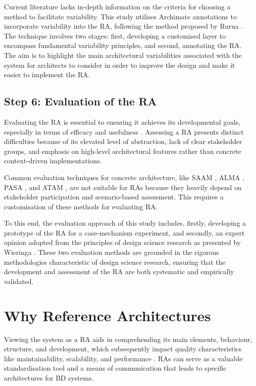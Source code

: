 \documentclass[review]{elsarticle}
\begin{document}
Current literature lacks in-depth information on the criteria for choosing a method to facilitate variability. This study utilises Archimate annotations to incorporate variability into the RA, following the method proposed by Rurua \cite{rurua2019representing}. The technique involves two stages: first, developing a customised layer to encompass fundamental variability principles, and second, annotating the RA. The aim is to highlight the main architectural variabilities associated with the system for architects to consider in order to improve the design and make it easier to implement the RA.

\subsection{Step 6: Evaluation of the RA}

Evaluating the RA is essential to ensuring it achieves its developmental goals, especially in terms of efficacy and usefulness \cite{Galster2011}. Assessing a RA presents distinct difficulties because of its elevated level of abstraction, lack of clear stakeholder groups, and emphasis on high-level architectural features rather than concrete context-driven implementations.

Common evaluation techniques for concrete architecture, like SAAM \cite{kazman1994saam}, ALMA \cite{Bengtsson2004}, PASA \cite{Williams2002}, and ATAM \cite{KazmanATAM}, are not suitable for RAs because they heavily depend on stakeholder participation and scenario-based assessment. This requires a customisation of these methods for evaluating RA.

To this end, the evaluation approach of this study includes, firstly, developing a prototype of the RA for a case-mechanism experiment, and secondly, an expert opinion adopted from the principles of design science research as presented by Wieringa \cite{wieringa2014design}. These two evaluation methods are grounded in the rigorous methodologies characteristic of design science research, ensuring that the development and assessment of the RA are both systematic and empirically validated.

\section{Why Reference Architectures}

\label{sec:why_reference_architectures}

Viewing the system as a RA aids in comprehending its main elements, behaviour, structure, and development, which subsequently impact quality characteristics like maintainability, scalability, and performance \cite{Cloutier2010}. RAs can serve as a valuable standardisation tool and a means of communication that leads to specific architectures for BD systems. 
\end{document}
